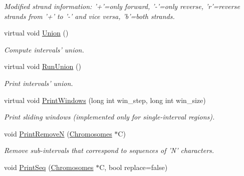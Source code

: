 \begin{CompactItemize}
\begin{CompactList}\small\item\em Modified strand information: '+'=only forward, '-'=only reverse, 'r'=reverse strands from '+' to '-' and vice versa, 'b'=both strands. \item\end{CompactList}\item 
\hypertarget{classGenomicRegion_05cb47d38946b780f7eb585074ccf393}{
virtual void \hyperlink{classGenomicRegion_05cb47d38946b780f7eb585074ccf393}{Union} ()}
\label{classGenomicRegion_05cb47d38946b780f7eb585074ccf393}

\begin{CompactList}\small\item\em Compute intervals' union. \item\end{CompactList}\item 
\hypertarget{classGenomicRegion_3d90c15accabfd5c0279f27f3513ba7c}{
virtual void \hyperlink{classGenomicRegion_3d90c15accabfd5c0279f27f3513ba7c}{RunUnion} ()}
\label{classGenomicRegion_3d90c15accabfd5c0279f27f3513ba7c}

\begin{CompactList}\small\item\em Print intervals' union. \item\end{CompactList}\item 
\hypertarget{classGenomicRegion_3962ea71432f3977b1ac501e4e878480}{
virtual void \hyperlink{classGenomicRegion_3962ea71432f3977b1ac501e4e878480}{PrintWindows} (long int win\_\-step, long int win\_\-size)}
\label{classGenomicRegion_3962ea71432f3977b1ac501e4e878480}

\begin{CompactList}\small\item\em Print sliding windows (implemented only for single-interval regions). \item\end{CompactList}\item 
\hypertarget{classGenomicRegion_a2a5b753401e9f9d64a30cfbbdf23f60}{
void \hyperlink{classGenomicRegion_a2a5b753401e9f9d64a30cfbbdf23f60}{PrintRemoveN} (\hyperlink{classChromosomes}{Chromosomes} $\ast$C)}
\label{classGenomicRegion_a2a5b753401e9f9d64a30cfbbdf23f60}

\begin{CompactList}\small\item\em Remove sub-intervals that correspond to sequences of 'N' characters. \item\end{CompactList}\item 
\hypertarget{classGenomicRegion_4b52d78052e0109b1fceafe450cfdedd}{
void \hyperlink{classGenomicRegion_4b52d78052e0109b1fceafe450cfdedd}{PrintSeq} (\hyperlink{classChromosomes}{Chromosomes} $\ast$C, bool replace=false)}
\label{classGenomicRegion_4b52d78052e0109b1fceafe450cfdedd}


\end{CompactItemize}
